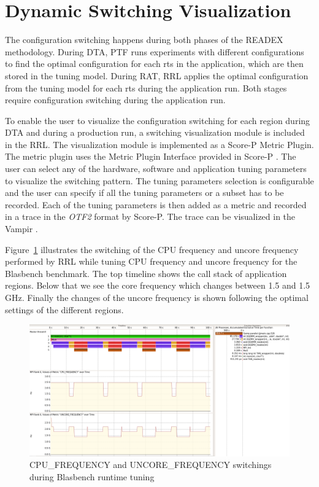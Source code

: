 \section{Dynamic Switching Visualization} \label{switching-visualization}
The configuration switching happens during both phases of the READEX methodology. 
During DTA, PTF runs experiments with different configurations to find the optimal configuration for each rts in the application, which are then stored in the tuning model. During RAT, RRL applies the optimal configuration from the tuning model for each rts during the application run. Both stages require configuration switching during the application run.

To enable the user to visualize the configuration switching for each region during DTA and during a production run, a switching visualization module is included in the RRL. 
The visualization module is implemented as a Score-P Metric Plugin. The metric plugin uses the Metric Plugin Interface provided in Score-P \cite{Schoene2017}. The user can select any of the hardware, software and application tuning parameters to visualize the switching pattern. The tuning parameters selection is configurable and the user can specify if all the tuning parameters or a subset has to be recorded. Each of the tuning parameters is then added as a metric and recorded in a trace in the \textit{OTF2} format \cite{Ilsche-Cstate} by Score-P. The trace can be visualized in the Vampir \cite{BHJR:10:VampirOverview}. 
 
Figure~\ref{fig:switch_visualization} illustrates the switching of the CPU frequency and uncore frequency performed by RRL while tuning CPU frequency and uncore frequency for the Blasbench benchmark. The top timeline shows the call stack of application regions. Below that we see the core frequency which changes between 1.5 and 1.5 GHz. Finally the changes of the uncore frequency is shown following the optimal settings of the different regions.

\begin{figure}[!t]
\centering
\includegraphics[width=.95\columnwidth]{figures/visualization_trace.png}
\caption{{CPU\_FREQUENCY} and {UNCORE\_FREQUENCY} switchings during Blasbench runtime tuning}
\label{fig:switch_visualization}
\end{figure}

 